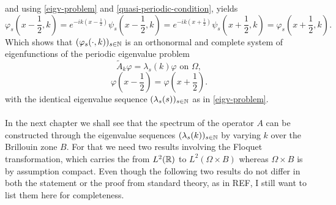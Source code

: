 and using \eqref{eigv-problem} and \eqref{quasi-periodic-condition}, yields
		\[ \varphi_{s}(x - \frac{1}{2}, k) = e^{-ik(x - \frac{1}{2})} \psi_{s}(x - \frac{1}{2}, k) = e^{-ik(x + \frac{1}{2})} \psi_{s}(x + \frac{1}{2}, k) = \varphi_{s}(x + \frac{1}{2}, k). \]
Which shows that $(\varphi_{s}(\cdot, k))_{s \in \mathbb{N}}$ is an orthonormal and complete system of eigenfunctions of the periodic eigenvalue problem
	\begin{equation}
		\tilde{A}_{k} \varphi = \lambda_{s}(k)
		 \varphi \text{ on } \Omega, \label{mod-eigv-problem}
	\end{equation}
	\begin{equation}
		 \varphi(x - \frac{1}{2}) = \varphi(x + \frac{1}{2}). \label{periodic-condition}
	\end{equation}
with the identical eigenvalue sequence $(\lambda_{s}(s))_{s \in \mathbb{N}}$ as in \eqref{eigv-problem}.
~\\ ~\\
In the next chapter we shall see that the spectrum of the operator $A$ can be constructed through the eigenvalue sequences $(\lambda_{s}(k))_{s \in \mathbb{N}}$ by varying $k$ over the Brillouin zone $B$. For that we need two results involving the Floquet transformation, which carries the from $L^{2}(\mathbb{R})$ to $L^{2}(\Omega \times B)$ whereas $\Omega \times B$ is by assumption compact. Even though the following two results do not differ in both the statement or the proof from standard theory, as in REF, I still want to list them here for completeness. %
